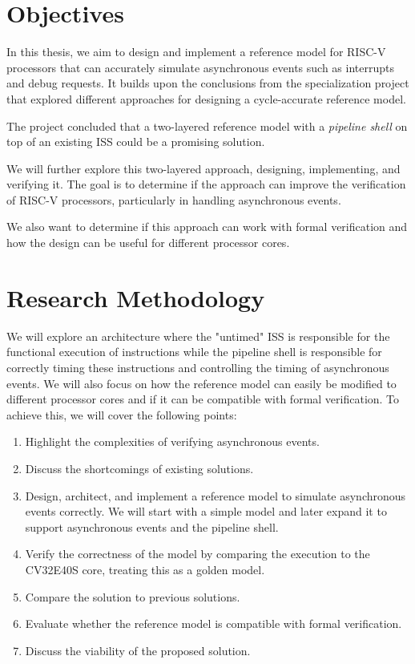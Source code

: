 \section{Objectives}




In this thesis, we aim to design and implement a reference model for RISC-V processors that can accurately simulate asynchronous events such as interrupts and debug requests. It builds upon the conclusions from the specialization project \cite{torjenygaardeikenesDesigningRISCVReference2023} that explored different approaches for designing a cycle-accurate reference model. 

The project concluded that a two-layered reference model with a \textit{pipeline shell} on top of an existing ISS could be a promising solution. 

We will further explore this two-layered approach, designing, implementing, and verifying it. The goal is to determine if the approach can improve the verification of RISC-V processors, particularly in handling asynchronous events. 

We also want to determine if this approach can work with formal verification and how the design can be useful for different processor cores.


\section{Research Methodology}

We will explore an architecture where the "untimed" ISS is responsible for the functional execution of instructions while the pipeline shell is responsible for correctly timing these instructions and controlling the timing of asynchronous events. We will also focus on how the reference model can easily be modified to different processor cores and if it can be compatible with formal verification.  
To achieve this, we will cover the following points:

\begin{enumerate}
    \item Highlight the complexities of verifying asynchronous events. 
    \item Discuss the shortcomings of existing solutions.
    \item Design, architect, and implement a reference model to simulate asynchronous events correctly. We will start with a simple model and later expand it to support asynchronous events and the pipeline shell.
    \item Verify the correctness of the model by comparing the execution to the CV32E40S core, treating this as a golden model.
    \item Compare the solution to previous solutions.
    \item Evaluate whether the reference model is compatible with formal verification.
    \item Discuss the viability of the proposed solution.
\end{enumerate}

